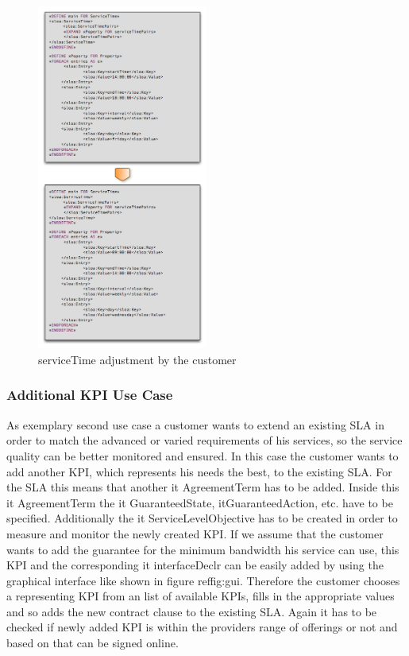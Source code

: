 \begin{figure}[ht]
		\centering
\includegraphics[width=0.5\textwidth]{fig/ServiceTimeChange.png}
\caption{serviceTime adjustment by the customer}
\label{fig:serviceTime}
\end{figure}



\subsubsection{Additional KPI Use Case}
As exemplary second use case a customer wants to extend an existing SLA in order to match the advanced or varied requirements of his services, so the service quality can be better monitored and ensured. In this case the customer wants to add another KPI, which represents his needs the best, to the existing SLA. For the SLA this means that another {it AgreementTerm} has to be added. Inside this {it AgreementTerm} the {it GuaranteedState}, it{GuaranteedAction}, etc. have to be specified. 
Additionally the {it ServiceLevelObjective} has to be created in order to measure and monitor the newly created KPI. If we assume that the customer wants to add the guarantee for the minimum bandwidth his service can use, this KPI and the corresponding {it interfaceDeclr} can be easily added by using the graphical interface like shown in figure ref{fig:gui}. Therefore the customer chooses a representing KPI from an list of available KPIs, fills in the appropriate values and so adds the new contract clause to the existing SLA. Again it has to be checked if newly added KPI is within the providers range of offerings or not and based on that can be signed online.


